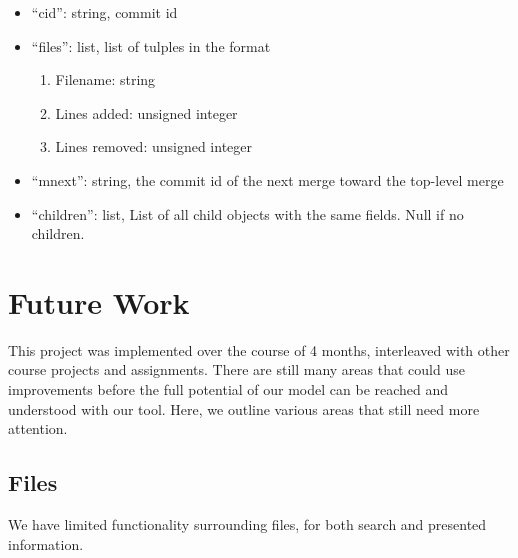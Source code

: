 \documentclass[conference, draftclsnofoot]{IEEEtran}
\begin{document}
\begin{itemize}
        \item ``cid'': string, commit id
        \item ``files'': list, list of tulples in the format
                \begin{enumerate}
                        \item Filename: string
                        \item Lines added: unsigned integer
                        \item Lines removed: unsigned integer
                \end{enumerate}
        \item ``mnext'': string, the commit id of the next merge toward the
                top-level merge
        \item ``children'': list, List of all child objects with the same
                fields. Null if no children.
\end{itemize}



\section{Future Work}

This project was implemented over the course of 4 months, interleaved with
other course projects and assignments. There are still many areas that could
use improvements before the full potential of our model can be reached and
understood with our tool. Here, we outline various areas that still need more
attention.

\subsection{Files}
We have limited functionality surrounding files, for both search and presented
information.


%
\end{document}

